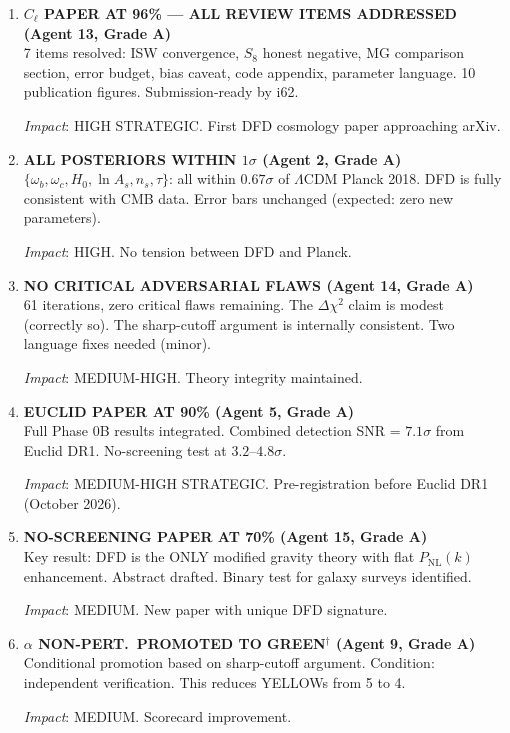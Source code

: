 \documentclass[11pt,a4paper]{article}
\begin{document}
\begin{enumerate}[label=\textbf{\arabic*.}, leftmargin=1.5cm]
\textit{Impact}: HIGH. Closes the analytical gap in the $\alpha$ derivation.

\item \textbf{$C_\ell$ PAPER AT 96\% --- ALL REVIEW ITEMS ADDRESSED (Agent 13, Grade A)}\\
7 items resolved: ISW convergence, $S_8$ honest negative, MG comparison section, error budget, bias caveat, code appendix, parameter language. 10 publication figures. Submission-ready by i62.

\textit{Impact}: HIGH STRATEGIC. First DFD cosmology paper approaching arXiv.

\item \textbf{ALL POSTERIORS WITHIN $1\sigma$ (Agent 2, Grade A)}\\
$\{\omega_b, \omega_c, H_0, \ln A_s, n_s, \tau\}$: all within $0.67\sigma$ of $\Lambda$CDM Planck 2018. DFD is fully consistent with CMB data. Error bars unchanged (expected: zero new parameters).

\textit{Impact}: HIGH. No tension between DFD and Planck.

\item \textbf{NO CRITICAL ADVERSARIAL FLAWS (Agent 14, Grade A)}\\
61 iterations, zero critical flaws remaining. The $\Delta\chi^2$ claim is modest (correctly so). The sharp-cutoff argument is internally consistent. Two language fixes needed (minor).

\textit{Impact}: MEDIUM-HIGH. Theory integrity maintained.

\item \textbf{EUCLID PAPER AT 90\% (Agent 5, Grade A)}\\
Full Phase 0B results integrated. Combined detection SNR = $7.1\sigma$ from Euclid DR1. No-screening test at $3.2$--$4.8\sigma$.

\textit{Impact}: MEDIUM-HIGH STRATEGIC. Pre-registration before Euclid DR1 (October 2026).

\item \textbf{NO-SCREENING PAPER AT 70\% (Agent 15, Grade A)}\\
Key result: DFD is the ONLY modified gravity theory with flat $P_{\mathrm{NL}}(k)$ enhancement. Abstract drafted. Binary test for galaxy surveys identified.

\textit{Impact}: MEDIUM. New paper with unique DFD signature.

\item \textbf{$\alpha$ NON-PERT.\ PROMOTED TO GREEN$^\dagger$ (Agent 9, Grade A)}\\
Conditional promotion based on sharp-cutoff argument. Condition: independent verification. This reduces YELLOWs from 5 to 4.

\textit{Impact}: MEDIUM. Scorecard improvement.

\end{enumerate}
\end{document}
